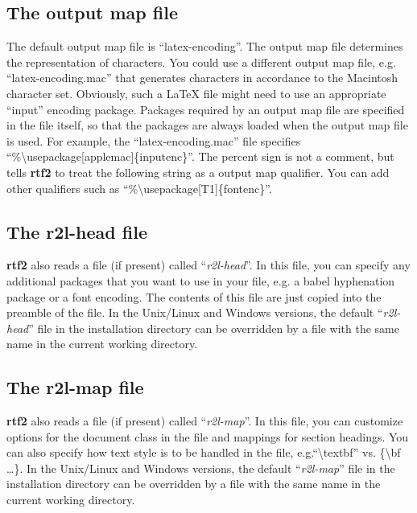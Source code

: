 \documentclass[11pt]{article}
\def\rtf2latex2e{{\bf rtf2\LaTeXe}}
\begin{document}
\subsection{The output map file}
The default output map file is ``latex-encoding''. The output map file determines
the {\LaTeXe} representation of characters. You could use a different output
map file, e.g. ``latex-encoding.mac'' that generates characters in accordance
to the Macintosh character set. Obviously, such a LaTeX file might need to
use an appropriate ``input'' encoding package. Packages required by an
output map file are specified in the file itself, so that the packages
are always loaded when the output map file is used. For example,
the ``latex-encoding.mac'' file
specifies ``\%{\textbackslash}usepackage[applemac]\{inputenc\}''.
The percent sign is not a comment, but tells \rtf2latex2e to treat
the following string as a output map qualifier.
You can add other qualifiers such as ``\%{\textbackslash}usepackage[T1]\{fontenc\}''.

\subsection{The r2l-head file}
\rtf2latex2e also reads a file (if present) called
``\textit{r2l-head}''.  In this file, you can specify any additional
packages that you want to use in your {\LaTeXe} file, e.g. a babel
hyphenation package or a font encoding.  The contents of this file are
just copied into the preamble of the {\LaTeXe} file.  In the Unix/Linux
and Windows versions, the default ``\textit{r2l-head}'' file in the
installation directory can be overridden by a file with the same name
in the current working directory.

\subsection{The r2l-map file}
\rtf2latex2e also reads a file (if present) called
``\textit{r2l-map}''.  In this file, you can customize options for the
document class in the {\LaTeXe} file and mappings for section headings. 
You can also specify how text style is to be handled in the {\LaTeXe}
file, e.g.\thinspace``\textbackslash {textbf}'' vs.\thinspace
\{\textbackslash bf \ldots\}.  In the Unix/Linux and Windows versions,
the default ``\textit{r2l-map}'' file in the installation directory
can be overridden by a file with the same name in the current working
directory.
\end{document}
